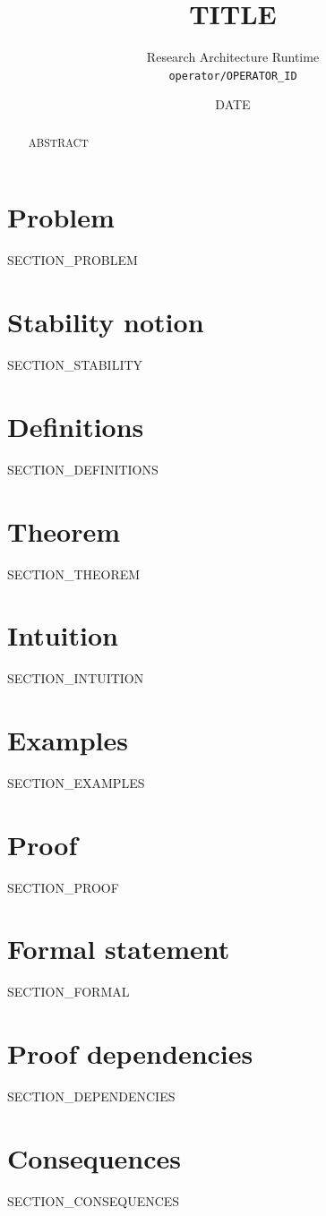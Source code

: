 \documentclass[12pt]{article}
\title{{{TITLE}}}
\author{Research Architecture Runtime\\[0.25em]
{\normalsize\texttt{operator/{{OPERATOR_ID}}}}}
\date{{{DATE}}}
\theoremstyle{plain}
\theoremstyle{definition}
\theoremstyle{remark}
\begin{document}
\maketitle

\begin{abstract}
{{ABSTRACT}}
\end{abstract}

\noindent
\begin{center}
\end{center}
\vspace{0.6em}

\section{Problem}
{\raggedright\sloppy
{{SECTION_PROBLEM}}
\par}

\section{Stability notion}
{{SECTION_STABILITY}}

\section{Definitions}
{{SECTION_DEFINITIONS}}

\section{Theorem}
{{SECTION_THEOREM}}

\section{Intuition}
{{SECTION_INTUITION}}

\section{Examples}
{{SECTION_EXAMPLES}}

\section{Proof}
{{SECTION_PROOF}}

\section{Formal statement}
{\raggedright\sloppy
{{SECTION_FORMAL}}
\par}

\section{Proof dependencies}
{\raggedright\sloppy
{{SECTION_DEPENDENCIES}}
\par}

\section{Consequences}
{\raggedright\sloppy
{{SECTION_CONSEQUENCES}}
\par}
\end{document}
